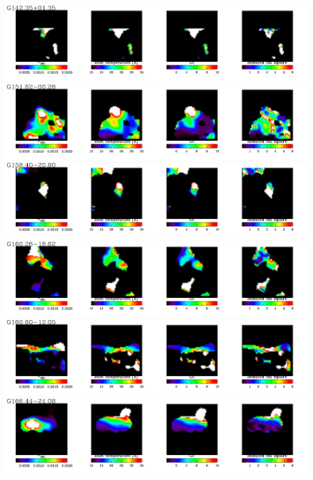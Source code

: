   \begin{figure}
\centering
\includegraphics[trim=0 2mm 0 0, clip, width=190mm]{appA/appA_36.pdf}
\includegraphics[trim=0 2mm 0 0, clip, width=190mm]{appA/appA_37.pdf}
\includegraphics[trim=0 2mm 0 0, clip, width=190mm]{appA/appA_38.pdf}
\includegraphics[trim=0 2mm 0 0, clip, width=190mm]{appA/appA_39.pdf}
\includegraphics[trim=0 2mm 0 0, clip, width=190mm]{appA/appA_40.pdf}
\includegraphics[trim=0 2mm 0 0, clip, width=190mm]{appA/appA_41.pdf}
  \end{figure}
  
